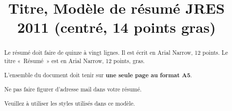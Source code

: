 \documentclass{jres-resume}
\title{Titre, Modèle de résumé JRES 2011 (centré, 14 points gras)}
\begin{document}
\maketitle


\begin{abstract}
Le résumé doit faire de quinze à vingt lignes. Il est écrit en Arial
Narrow, 12 points. Le titre «~Résumé~» est en Arial Narrow,
12 points, gras.

L'ensemble du document doit tenir sur \textbf{une seule page au format A5}.

Ne pas faire figurer d'adresse mail dans votre résumé.

Veuillez à utiliser les styles utilisés dans ce modèle.

\end{abstract}
\end{document}
